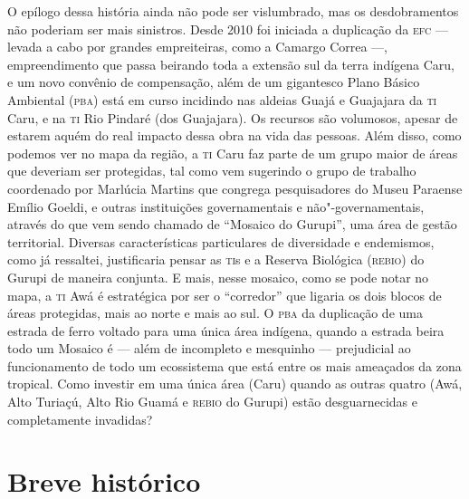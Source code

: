 O epílogo dessa história ainda não pode ser vislumbrado, mas os
desdobramentos não poderiam ser mais sinistros. Desde 2010 foi iniciada
a duplicação da \textsc{efc} --- levada a cabo por grandes empreiteiras, como a
Camargo Correa ---, empreendimento que passa beirando toda a extensão sul
da terra indígena Caru, e um novo convênio de compensação, além de um
gigantesco Plano Básico Ambiental (\textsc{pba}) está em curso incidindo nas
aldeias Guajá e Guajajara da \textsc{ti} Caru, e na \textsc{ti} Rio Pindaré (dos
Guajajara). Os recursos são volumosos, apesar de estarem aquém do real
impacto dessa obra na vida das pessoas. Além disso, como podemos ver no
mapa da região, a \textsc{ti} Caru faz parte de um grupo maior de áreas que
deveriam ser protegidas, tal como vem sugerindo o grupo de trabalho
coordenado por Marlúcia Martins que congrega pesquisadores do Museu
Paraense Emílio Goeldi, e outras instituições governamentais e
não"-governamentais, através do que vem sendo chamado de ``Mosaico do
Gurupi'', uma área de gestão territorial. Diversas características
particulares de diversidade e endemismos, como já ressaltei,
justificaria pensar as \textsc{ti}s e a Reserva Biológica (\textsc{rebio}) do Gurupi de
maneira conjunta. E mais, nesse mosaico, como se pode notar no mapa, a
\textsc{ti} Awá é estratégica por ser o ``corredor'' que ligaria os dois blocos
de áreas protegidas, mais ao norte e mais ao sul. O \textsc{pba} da duplicação de
uma estrada de ferro voltado para uma única área indígena, quando a
estrada beira todo um Mosaico é --- além de incompleto e mesquinho ---
prejudicial ao funcionamento de todo um ecossistema que está entre os
mais ameaçados da zona tropical. Como investir em uma única área (Caru)
quando as outras quatro (Awá, Alto Turiaçú, Alto Rio Guamá e \textsc{rebio} do
Gurupi) estão desguarnecidas e completamente invadidas?

\section{Breve histórico }\label{breve-histuxf3rico}


